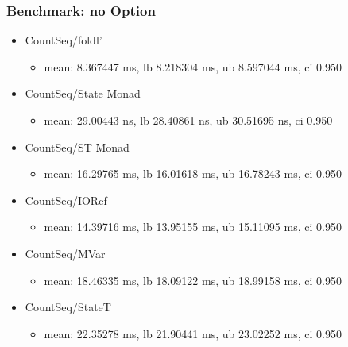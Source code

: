 \begin{frame}\frametitle{Benchmark: no Option}

\begin{itemize}
\item
  CountSeq/foldl'

  \begin{itemize}
  \item
    mean: 8.367447 ms, lb 8.218304 ms, ub 8.597044 ms, ci 0.950
  \end{itemize}
\item
  CountSeq/State Monad

  \begin{itemize}
  \item
    mean: 29.00443 ns, lb 28.40861 ns, ub 30.51695 ns, ci 0.950
  \end{itemize}
\item
  CountSeq/ST Monad

  \begin{itemize}
  \item
    mean: 16.29765 ms, lb 16.01618 ms, ub 16.78243 ms, ci 0.950
  \end{itemize}
\item
  CountSeq/IORef

  \begin{itemize}
  \item
    mean: 14.39716 ms, lb 13.95155 ms, ub 15.11095 ms, ci 0.950
  \end{itemize}
\item
  CountSeq/MVar

  \begin{itemize}
  \item
    mean: 18.46335 ms, lb 18.09122 ms, ub 18.99158 ms, ci 0.950
  \end{itemize}
\item
  CountSeq/StateT

  \begin{itemize}
  \item
    mean: 22.35278 ms, lb 21.90441 ms, ub 23.02252 ms, ci 0.950
  \end{itemize}
\end{itemize}

\end{frame}

